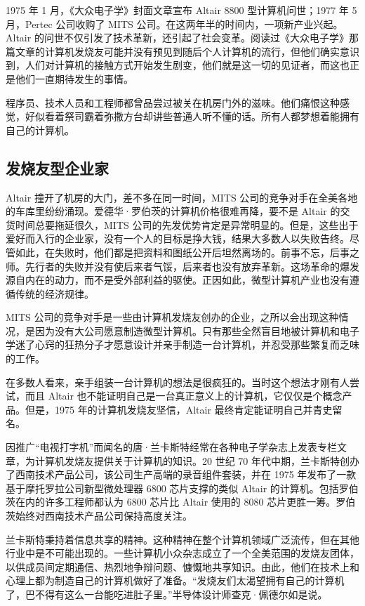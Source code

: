 \documentclass[12pt,UTF8]{ctexbook}
\begin{document}
1975 年 1 月，《大众电子学》封面文章宣布 Altair 8800 型计算机问世；1977 年 5 月，Pertec 公司收购了 MITS 公司。在这两年半的时间内，一项新产业兴起。Altair 的问世不仅引发了技术革新，还引起了社会变革。阅读过《大众电子学》那篇文章的计算机发烧友可能并没有预见到随后个人计算机的流行，但他们确实意识到，人们对计算机的接触方式开始发生剧变，他们就是这一切的见证者，而这也正是他们一直期待发生的事情。

程序员、技术人员和工程师都曾品尝过被关在机房门外的滋味。他们痛恨这种感觉，好似看着祭司霸着弥撒方台却讲些普通人听不懂的话。所有人都梦想着能拥有自己的计算机。





\subsection{发烧友型企业家}


Altair 撞开了机房的大门，差不多在同一时间，MITS 公司的竞争对手在全美各地的车库里纷纷涌现。爱德华·罗伯茨的计算机价格很难再降，要不是 Altair 的交货时间总要拖延很久，MITS 公司的先发优势肯定是异常明显的。但是，这些出于爱好而入行的企业家，没有一个人的目标是挣大钱，结果大多数人以失败告终。尽管如此，在失败时，他们都是把资料和图纸公开后坦然离场的。前事不忘，后事之师。先行者的失败并没有使后来者气馁，后来者也没有放弃革新。这场革命的爆发源自内在的动力，而不是受外部利益的驱使。正因如此，微型计算机产业也没有遵循传统的经济规律。

MITS 公司的竞争对手是一些由计算机发烧友创办的企业，之所以会出现这种情况，是因为没有大公司愿意制造微型计算机。只有那些全然盲目地被计算机和电子学迷了心窍的狂热分子才愿意设计并亲手制造一台计算机，并忍受那些繁复而乏味的工作。

在多数人看来，亲手组装一台计算机的想法是很疯狂的。当时这个想法才刚有人尝试，而且 Altair 也不能证明自己是一台真正意义上的计算机，它仅仅是个概念产品。但是，1975 年的计算机发烧友坚信，Altair 最终肯定能证明自己并青史留名。

因推广“电视打字机”而闻名的唐·兰卡斯特经常在各种电子学杂志上发表专栏文章，为计算机发烧友提供关于计算机的知识。20 世纪 70 年代中期，兰卡斯特创办了西南技术产品公司，该公司生产高端的录音组件套装，并在 1975 年发布了一款基于摩托罗拉公司新型微处理器 6800 芯片支撑的类似 Altair 的计算机。包括罗伯茨在内的许多工程师都认为 6800 芯片比 Altair 使用的 8080 芯片更胜一筹。罗伯茨始终对西南技术产品公司保持高度关注。

兰卡斯特秉持着信息共享的精神。这种精神在整个计算机领域广泛流传，但在其他行业中是不可能出现的。一些计算机小众杂志成立了一个全美范围的发烧友团体，以供成员间定期通信、热烈地争辩问题、慷慨地共享知识。由此，他们在技术上和心理上都为制造自己的计算机做好了准备。“发烧友们太渴望拥有自己的计算机了，巴不得有这么一台能吃进肚子里。”半导体设计师查克·佩德尔如是说。
\end{document}
